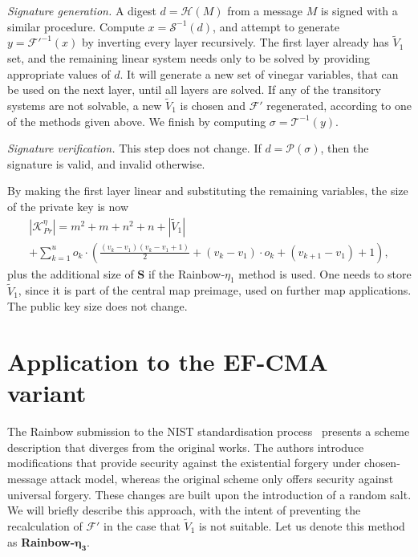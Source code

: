 \documentclass[openright, draft, 10pt]{report}
\begin{document}
\emph{Signature generation.}
A digest $d = \mathcal{H}(M)$ from a message $M$ is signed with a similar
procedure. Compute $x = \mathcal{S}^{-1}(d)$, and attempt to generate
$y = \mathcal{F}'^{-1}(x)$ by inverting every layer recursively. The first
layer already has $\widetilde{V}_{1}$ set, and the remaining linear system
needs only to be solved by providing appropriate values of $d$. It will
generate a new set of vinegar variables, that can be used on the next layer,
until all layers are solved. If any of the transitory systems are not solvable,
a new $\widetilde{V}_{1}$ is chosen and $\mathcal{F}'$ regenerated, according
to one of the methods given above. We finish by computing
$\sigma = \mathcal{T}^{-1}(y)$.

\emph{Signature verification.}
This step does not change. If $d = \mathcal{P}(\sigma)$, then the signature is
valid, and invalid otherwise.

By making the first layer linear and substituting the remaining variables, the
size of the private key is now
\begin{multline}
  |\mathcal{K}_{Pr}^{\eta}| = m^{2} + m + n^{2} + n
    + |\widetilde{V}_{1}| \\
    + \sum_{k = 1}^{u} o_{k} \cdot \left( \frac{(v_{k} - v_{1})(v_{k} - v_{1} + 1)}{2}
      + (v_{k} - v_{1}) \cdot o_{k} + (v_{k + 1} - v_{1}) + 1 \right),
\end{multline}
plus the additional size of $\mathbf{S}$ if the Rainbow-$\eta_{1}$ method is
used. One needs to store $\widetilde{V}_{1}$, since it is part of the central
map preimage, used on further map applications. The public key size does not
change.

\section{Application to the EF-CMA variant}\label{sec:efcma}

The Rainbow submission to the NIST standardisation
process~\cite{Ding:201712:misc} presents a scheme description that diverges
from the original works. The authors introduce modifications that provide
security against the existential forgery under chosen-message attack
model, whereas the original scheme only offers security against universal
forgery. These changes are built upon the introduction of a random salt. We
will briefly describe this approach, with the intent of preventing the
recalculation of $\mathcal{F}'$ in the case that $\widetilde{V}_{1}$ is not
suitable. Let us denote this method as \textbf{Rainbow-}$\mathbf{\eta_{3}}$.
\end{document}
